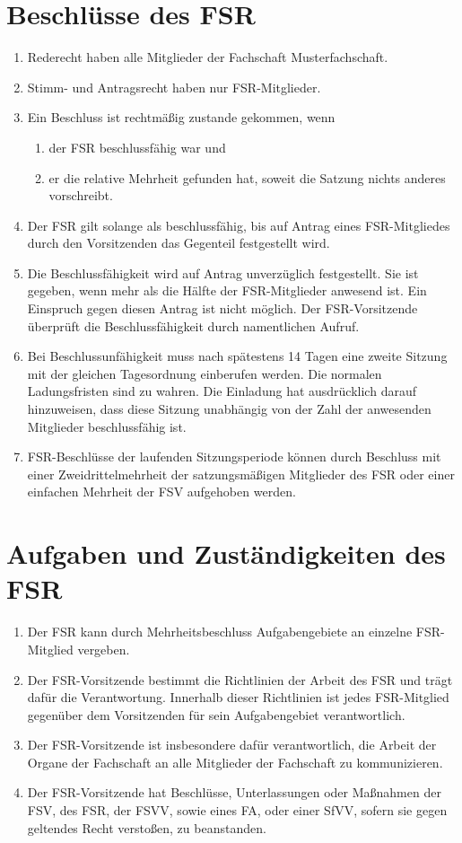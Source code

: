 \documentclass{article}
\newcommand{\fachschaft}{Musterfachschaft}
\begin{document}
\section{Beschlüsse des FSR}
\begin{enumerate}[(1)]
    \item Rederecht haben alle Mitglieder der Fachschaft \fachschaft.
	\item Stimm- und Antragsrecht haben nur FSR-Mitglieder.
	\item Ein Beschluss ist rechtmäßig zustande gekommen, wenn
	\begin{enumerate}[1.]
		\item der FSR beschlussfähig war und
		\item er die relative Mehrheit gefunden hat, soweit die Satzung nichts anderes vorschreibt.
	\end{enumerate}
	\item Der FSR gilt solange als beschlussfähig, bis auf Antrag eines FSR-Mitgliedes durch den Vorsitzenden das Gegenteil festgestellt wird.
	\item Die Beschlussfähigkeit wird auf Antrag unverzüglich festgestellt. Sie ist gegeben, wenn mehr als die Hälfte der FSR-Mitglieder anwesend ist. Ein Einspruch gegen diesen Antrag ist nicht möglich. Der FSR-Vorsitzende überprüft die Beschlussfähigkeit durch namentlichen Aufruf.
	\item Bei Beschlussunfähigkeit muss nach spätestens 14 Tagen eine zweite Sitzung mit der gleichen Tagesordnung einberufen werden. Die normalen Ladungsfristen sind zu wahren. Die Einladung hat ausdrücklich darauf hinzuweisen, dass diese Sitzung unabhängig von der Zahl der anwesenden Mitglieder beschlussfähig ist.
    \item FSR-Beschlüsse der laufenden Sitzungsperiode können durch Beschluss mit einer Zweidrittelmehrheit der satzungsmäßigen Mitglieder des FSR oder einer einfachen Mehrheit der FSV aufgehoben werden.
\end{enumerate}

\section{Aufgaben und Zuständigkeiten des FSR}
\begin{enumerate}[(1)]
    \item Der FSR kann durch Mehrheitsbeschluss Aufgabengebiete an einzelne FSR-Mitglied vergeben.
    \item Der FSR-Vorsitzende bestimmt die Richtlinien der Arbeit des FSR und trägt dafür die Verantwortung. Innerhalb dieser Richtlinien ist jedes FSR-Mitglied gegenüber dem Vorsitzenden für sein Aufgabengebiet verantwortlich.
	\item Der FSR-Vorsitzende ist insbesondere dafür verantwortlich, die Arbeit der Organe der Fachschaft an alle Mitglieder der Fachschaft zu kommunizieren.
	\item Der FSR-Vorsitzende hat Beschlüsse, Unterlassungen oder Maßnahmen der FSV, des FSR, der FSVV, sowie eines FA, oder einer SfVV, sofern sie gegen geltendes Recht verstoßen, zu beanstanden.
\end{enumerate}
\end{document}
